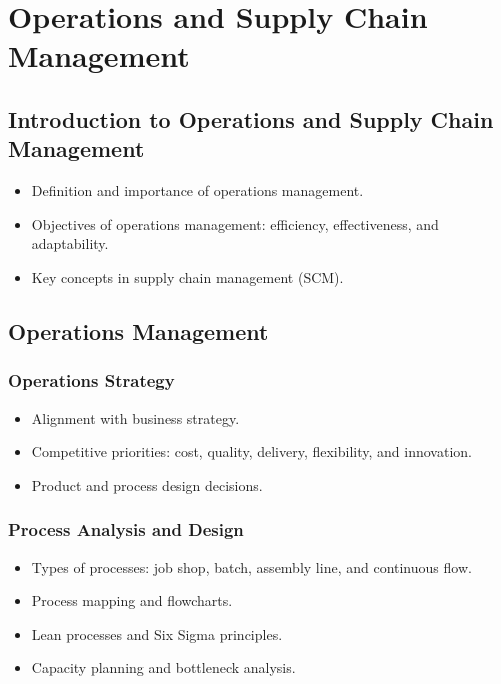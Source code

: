 \chapter{Operations and Supply Chain Management}

\section{Introduction to Operations and Supply Chain Management}
\begin{itemize}
    \item Definition and importance of operations management.
    \item Objectives of operations management: efficiency, effectiveness, and adaptability.
    \item Key concepts in supply chain management (SCM).
\end{itemize}

\section{Operations Management}
\subsection{Operations Strategy}
\begin{itemize}
    \item Alignment with business strategy.
    \item Competitive priorities: cost, quality, delivery, flexibility, and innovation.
    \item Product and process design decisions.
\end{itemize}

\subsection{Process Analysis and Design}
\begin{itemize}
    \item Types of processes: job shop, batch, assembly line, and continuous flow.
    \item Process mapping and flowcharts.
    \item Lean processes and Six Sigma principles.
    \item Capacity planning and bottleneck analysis.
\end{itemize}


